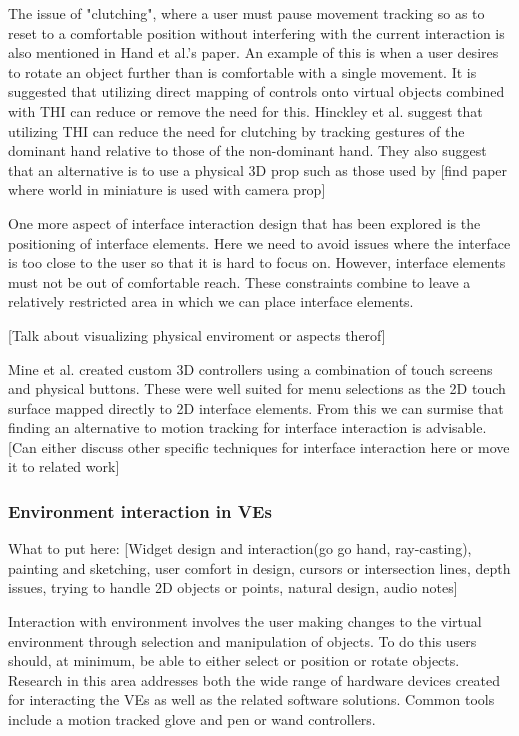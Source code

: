 \documentclass{sig-alternate-05-2015}
\begin{document}
 The issue of "clutching", where a user must pause movement tracking so as to reset to a comfortable position without interfering with the current interaction is also mentioned in Hand et al.'s paper.\cite{Hand1997} An example of this is when a user desires to rotate an object further than is comfortable with a single movement. It is suggested that utilizing direct mapping of controls onto virtual objects combined with THI can reduce or remove the need for this.\cite{Hand1997}  Hinckley et al. suggest that utilizing THI can reduce the need for clutching by tracking gestures of the dominant hand relative to those of the non-dominant hand.\cite{Hinckley1994} They also suggest that an alternative is to use a physical 3D prop such as those used by [find paper where world in miniature is used with camera prop]
 
 One more aspect of interface interaction design that has been explored is the positioning of interface elements.\cite{alger2015visual} Here we need to avoid issues where the interface is too close to the user so that it is hard to focus on. However, interface elements must not be out of comfortable reach. These constraints combine to leave a relatively restricted area in which we can place interface elements.
 
 [Talk about visualizing physical enviroment or aspects therof] 
 
 Mine et al. created custom 3D controllers using a combination of touch screens and physical buttons.\cite{Mine2014} These were well suited for menu selections as the 2D touch surface mapped directly to 2D interface elements. From this we can surmise that finding an alternative to motion tracking for interface interaction is advisable. [Can either discuss other specific techniques for interface interaction here or move it to related work]
 
 
\subsubsection{Environment interaction in VEs}
What to put here: [Widget design and interaction(go go hand, ray-casting), painting and sketching, user comfort in design, cursors or intersection lines, depth issues, trying to handle 2D objects or points, natural design, audio notes]


 Interaction with environment involves the user making changes to the virtual environment through selection and manipulation of objects. To do this users should, at minimum, be able to either select or position or rotate objects\cite{Bowman2001}. Research in this area addresses both the wide range of hardware devices created for interacting the VEs as well as the related software solutions. Common tools include a motion tracked glove \cite{Zimmerman1986} and pen or wand controllers.\cite{Schultheis2012}
 
\end{document}
